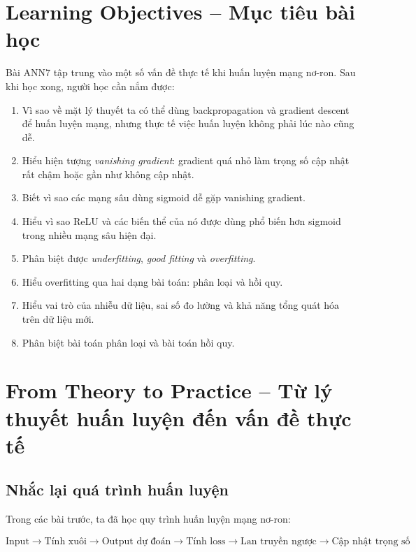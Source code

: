 

\section*{Learning Objectives -- Mục tiêu bài học}

Bài ANN7 tập trung vào một số vấn đề thực tế khi huấn luyện mạng nơ-ron. Sau khi học xong, người học cần nắm được:

\begin{enumerate}[label=\arabic*.]
    \item Vì sao về mặt lý thuyết ta có thể dùng backpropagation và gradient descent để huấn luyện mạng, nhưng thực tế việc huấn luyện không phải lúc nào cũng dễ.
    \item Hiểu hiện tượng \textit{vanishing gradient}: gradient quá nhỏ làm trọng số cập nhật rất chậm hoặc gần như không cập nhật.
    \item Biết vì sao các mạng sâu dùng sigmoid dễ gặp vanishing gradient.
    \item Hiểu vì sao ReLU và các biến thể của nó được dùng phổ biến hơn sigmoid trong nhiều mạng sâu hiện đại.
    \item Phân biệt được \textit{underfitting}, \textit{good fitting} và \textit{overfitting}.
    \item Hiểu overfitting qua hai dạng bài toán: phân loại và hồi quy.
    \item Hiểu vai trò của nhiễu dữ liệu, sai số đo lường và khả năng tổng quát hóa trên dữ liệu mới.
    \item Phân biệt bài toán phân loại và bài toán hồi quy.
\end{enumerate}

\section{From Theory to Practice -- Từ lý thuyết huấn luyện đến vấn đề thực tế}

\subsection{Nhắc lại quá trình huấn luyện}

Trong các bài trước, ta đã học quy trình huấn luyện mạng nơ-ron:

\[
    \text{Input}
    \rightarrow
    \text{Tính xuôi}
    \rightarrow
    \text{Output dự đoán}
    \rightarrow
    \text{Tính loss}
    \rightarrow
    \text{Lan truyền ngược}
    \rightarrow
    \text{Cập nhật trọng số}
\]

